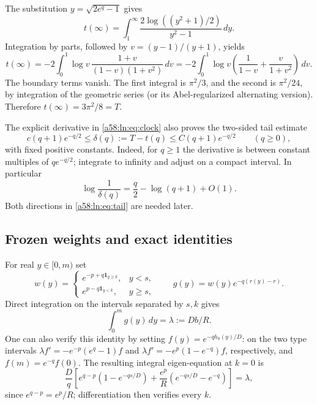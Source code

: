 \documentclass[11pt,letterpaper]{article}
\theoremstyle{remark}
\newcommand{\one}{\mathbf 1}
\newcommand{\dd}{\,d}
\begin{document}
The substitution $y=\sqrt{2e^q-1}$ gives
\[
 t(\infty)=\int_1^\infty
 \frac{2\log((y^2+1)/2)}{y^2-1}\dd y.
\]
Integration by parts, followed by $v=(y-1)/(y+1)$, yields
\[
 t(\infty)=-2\int_0^1\log v\,
 \frac{1+v}{(1-v)(1+v^2)}\dd v
 =-2\int_0^1\log v\left(\frac1{1-v}+\frac{v}{1+v^2}\right)\dd v.
\]
The boundary terms vanish. The first integral is $\pi^2/3$, and the
second is $\pi^2/24$, by integration of the geometric series (or its
Abel-regularized alternating version). Therefore $t(\infty)=3\pi^2/8=T$.

The explicit derivative in \eqref{a58:ln:eq:clock} also proves the two-sided tail
estimate
\begin{equation}\label{a58:ln:eq:tail}
 c(q+1)e^{-q/2}\le\delta(q):=T-t(q)\le C(q+1)e^{-q/2}
 \qquad(q\ge0),
\end{equation}
with fixed positive constants. Indeed, for $q\ge1$ the derivative is
between constant multiples of $qe^{-q/2}$; integrate to infinity and
adjust on a compact interval. In particular
\begin{equation}\label{a58:ln:eq:logtail}
 \log\frac1{\delta(q)}=\frac q2-\log(q+1)+O(1).
\end{equation}
Both directions in \eqref{a58:ln:eq:tail} are needed later.

\subsection{Frozen weights and exact identities}
For real $y\in[0,m)$ set
\[
 w(y)=\begin{cases}e^{-p+q\one_{y\ge k}},&y<s,\\
 e^{p-q\one_{y<k}},&y\ge s,
 \end{cases}
 \qquad g(y)=w(y)e^{-q(r(y)-r)}.
\]
Direct integration on the intervals separated by $s,k$ gives
\begin{equation}\label{a58:ln:eq:frozenintegral}
 \int_0^m g(y)\dd y=\lambda:=Db/R.
\end{equation}
One can also verify this identity by setting $f(y)=e^{-qh_0(y)/D}$:
on the two type intervals $\lambda f'=-e^{-p}(e^q-1)f$ and
$\lambda f'=-e^p(1-e^{-q})f$, respectively, and $f(m)=e^{-q}f(0)$.
The resulting integral eigen-equation at $k=0$ is
\[
 \frac Dq\left[e^{q-p}(1-e^{-qs/D})+
 \frac{e^p}{R}(e^{-qs/D}-e^{-q})\right]=\lambda,
\]
since $e^{q-p}=e^p/R$; differentiation then verifies every $k$.
\end{document}
